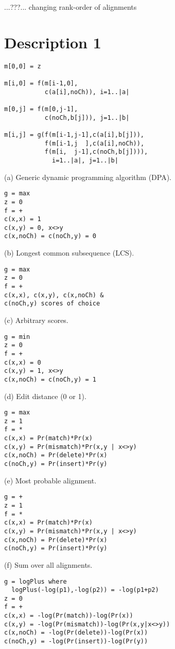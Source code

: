 \documentclass[letterpaper,11pt,oneside]{article}
\begin{document}
...???... changing rank-order of alignments


\section{Description 1}

\begin{verbatim}
m[0,0] = z

m[i,0] = f(m[i-1,0],
           c(a[i],noCh)), i=1..|a|

m[0,j] = f(m[0,j-1],
           c(noCh,b[j])), j=1..|b|

m[i,j] = g(f(m[i-1,j-1],c(a[i],b[j])),
           f(m[i-1,j  ],c(a[i],noCh)),
           f(m[i,  j-1],c(noCh,b[j]))),
             i=1..|a|, j=1..|b|
\end{verbatim}

(a) Generic dynamic programming algorithm (DPA).


\begin{verbatim}
g = max
z = 0
f = +
c(x,x) = 1
c(x,y) = 0, x<>y
c(x,noCh) = c(noCh,y) = 0
\end{verbatim}

(b) Longest common subsequence (LCS).


\begin{verbatim}
g = max
z = 0
f = +
c(x,x), c(x,y), c(x,noCh) &
c(noCh,y) scores of choice
\end{verbatim}

(c) Arbitrary scores.


\begin{verbatim}
g = min
z = 0
f = +
c(x,x) = 0
c(x,y) = 1, x<>y
c(x,noCh) = c(noCh,y) = 1
\end{verbatim}

(d) Edit distance (0 or 1).


\begin{verbatim}
g = max
z = 1
f = *
c(x,x) = Pr(match)*Pr(x)
c(x,y) = Pr(mismatch)*Pr(x,y | x<>y)
c(x,noCh) = Pr(delete)*Pr(x)
c(noCh,y) = Pr(insert)*Pr(y)
\end{verbatim}

(e) Most probable alignment.


\begin{verbatim}
g = +
z = 1
f = *
c(x,x) = Pr(match)*Pr(x)
c(x,y) = Pr(mismatch)*Pr(x,y | x<>y)
c(x,noCh) = Pr(delete)*Pr(x)
c(noCh,y) = Pr(insert)*Pr(y)
\end{verbatim}

(f) Sum over all alignments.


\begin{verbatim}
g = logPlus where
  logPlus(-log(p1),-log(p2)) = -log(p1+p2)
z = 0
f = +
c(x,x) = -log(Pr(match))-log(Pr(x))
c(x,y) = -log(Pr(mismatch))-log(Pr(x,y|x<>y))
c(x,noCh) = -log(Pr(delete))-log(Pr(x))
c(noCh,y) = -log(Pr(insert))-log(Pr(y))
\end{verbatim}
\end{document}
